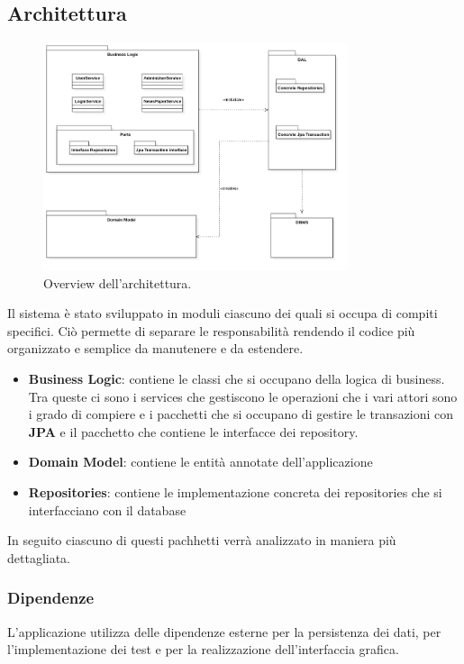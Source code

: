 \subsection{Architettura}
\begin{figure}
    \centering
    \includegraphics[width=0.8\textwidth]{Resources/graficiUML/Overview.png}        
    \caption{Overview dell'architettura.}
    \label{fig:overview dell'architettura}
\end{figure}
Il sistema è stato sviluppato in moduli ciascuno dei quali si occupa di compiti specifici.
Ciò permette di separare le responsabilità rendendo il codice più organizzato e semplice 
da manutenere e da estendere.
\begin{itemize}
    \item \textbf{Business Logic}: contiene le classi che si occupano della logica di 
    business. Tra queste ci sono i services che gestiscono le operazioni che i vari 
    attori sono i grado di compiere e i pacchetti che si occupano di gestire le transazioni con \textbf{JPA} e il pacchetto 
    che contiene le interfacce dei repository.
    \item \textbf{Domain Model}: contiene le entità annotate dell'applicazione
    \item \textbf{Repositories}: contiene le implementazione concreta dei repositories che si interfacciano con il database
\end{itemize}
In seguito ciascuno di questi pachhetti verrà analizzato in maniera più dettagliata.

\subsubsection{Dipendenze}
L'applicazione utilizza delle dipendenze esterne per la persistenza dei dati, 
per l'implementazione dei test e per la realizzazione dell'interfaccia grafica.

